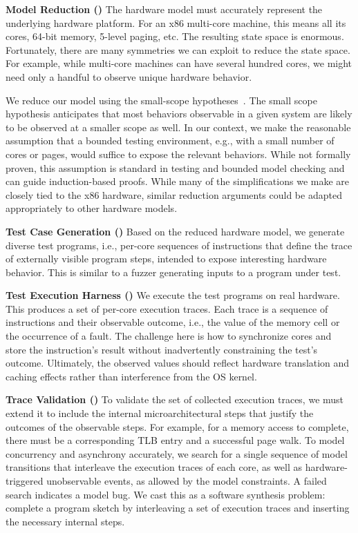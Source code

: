 \noindent\textbf{Model Reduction ()}
The hardware model must accurately represent the underlying hardware platform. 
For an x86 multi-core machine, this means all its cores, 64-bit memory, 5-level paging, etc. 
The resulting state space is enormous.
Fortunately, there are many symmetries we can exploit to reduce the state space. 
For example, while multi-core machines can have several hundred cores, we might need only a handful to observe unique hardware behavior.

We reduce our model using the small-scope hypotheses~\cite{Jackson:2002:Alloy}. The small scope hypothesis anticipates that most behaviors observable in a given system are likely to be observed at a smaller scope as well. In our context, we make the reasonable assumption that a bounded testing environment, e.g., with a small number of cores or pages, would suffice to expose the relevant behaviors. 
While not formally proven, this assumption is standard in testing and bounded model checking and can guide induction-based proofs. While many of the simplifications we make are closely tied to the x86 hardware, similar reduction arguments could be adapted appropriately to other hardware models.

\noindent\textbf{Test Case Generation ()}
Based on the reduced hardware model, we generate diverse test programs, i.e., per-core sequences of instructions that define the trace of externally visible program steps, intended to expose interesting hardware behavior.
This is similar to a fuzzer generating inputs to a program under test. 

\noindent\textbf{Test Execution Harness ()}
We execute the test programs on real hardware.
This produces a set of per-core execution traces. Each trace is a sequence of instructions and their observable outcome, i.e., the value of the memory cell or the occurrence of a fault.
The challenge here is how to synchronize cores and store the instruction's result without inadvertently constraining the test's outcome.  
Ultimately, the observed values should reflect hardware translation and caching effects rather than interference from the OS kernel. 

\noindent\textbf{Trace Validation ()}
To validate the set of collected execution traces, we must extend it to include the internal microarchitectural steps that justify the outcomes of the observable steps. 
For example, for a memory access to complete, there must be a corresponding TLB entry and a successful page walk.
To model concurrency and asynchrony accurately, we search for a single sequence of model transitions that interleave the execution traces of each core, as well as hardware-triggered unobservable events, as allowed by the model constraints.
A failed search indicates a model bug.
We cast this as a software synthesis problem: complete a program sketch by interleaving a set of execution traces and inserting the necessary internal steps.

